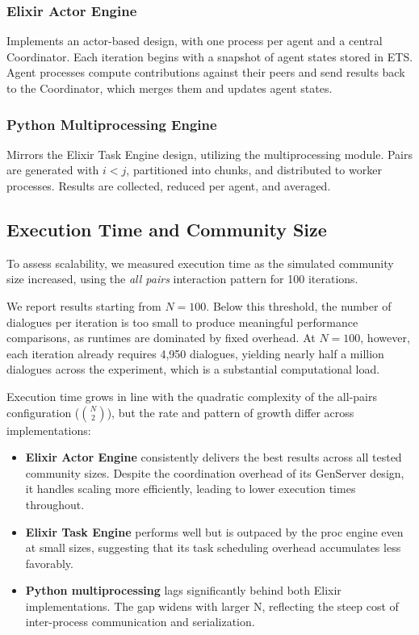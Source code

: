 \documentclass[
]{ceurart}
\begin{document}
\subsubsection{Elixir Actor Engine}
Implements an actor-based design, with one process per agent and a central Coordinator. Each iteration begins with a snapshot of agent states stored in ETS. Agent processes compute contributions against their peers and send results back to the Coordinator, which merges them and updates agent states.

\subsubsection{Python Multiprocessing Engine}
Mirrors the Elixir Task Engine design, utilizing the multiprocessing module. Pairs are generated with $i < j$, partitioned into chunks, and distributed to worker processes. Results are collected, reduced per agent, and averaged.


\subsection{Execution Time and Community Size}
To assess scalability, we measured execution time as the simulated community size increased, using the \emph{all pairs} interaction pattern for 100 iterations.

We report results starting from $N=100$. Below this threshold, the number of dialogues per iteration is too small to produce meaningful performance comparisons, as runtimes are dominated by fixed overhead. At $N=100$, however, each iteration already requires 4,950 dialogues, yielding nearly half a million dialogues across the experiment, which is a substantial computational load.

Execution time grows in line with the quadratic complexity of the all-pairs configuration ($\binom{N}{2}$), but the rate and pattern of growth differ across implementations:

\begin{itemize}
\item \textbf{Elixir Actor Engine} consistently delivers the best results across all tested community sizes. Despite the coordination overhead of its GenServer design, it handles scaling more efficiently, leading to lower execution times throughout.
\item \textbf{Elixir Task Engine} performs well but is outpaced by the proc engine even at small sizes, suggesting that its task scheduling overhead accumulates less favorably.
\item \textbf{Python multiprocessing} lags significantly behind both Elixir implementations. The gap widens with larger N, reflecting the steep cost of inter-process communication and serialization.
\end{itemize}
\end{document}
